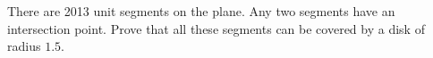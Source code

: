 \problem
There are 2013 unit segments on the plane.
Any two segments have an intersection point.
Prove that all these segments can be covered by a disk of radius $1.5$.
\solution
\endproblem
